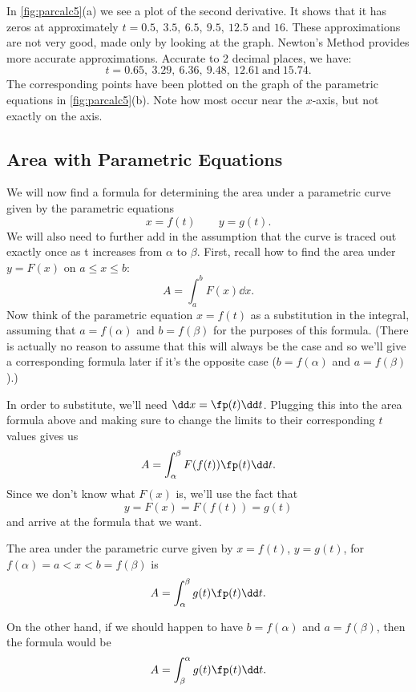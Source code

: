 \begin{example}
In \autoref{fig:parcalc5}(a) we see a plot of the second derivative. It shows that it has zeros at approximately $t=0.5,\ 3.5,\ 6.5,\ 9.5,\ 12.5$ and $16$. These approximations are not very good, made only by looking at the graph. Newton's Method provides more accurate approximations. Accurate to 2 decimal places, we have:
\[t=0.65,\ 3.29,\ 6.36,\ 9.48,\ 12.61\ \text{and}\ 15.74.\]
The corresponding points have been plotted on the graph of the parametric equations in \autoref{fig:parcalc5}(b). Note how most occur near the $x$-axis, but not exactly on the axis.
\end{example}


\subsection{Area with Parametric Equations}

We will now find a formula for determining the area under a parametric curve given by the parametric equations
\[x=f(t)\qquad y=g(t).\]
We will also need to further add in the assumption that the curve is traced out exactly once as t increases from $\alpha$ to $\beta$.
%
First, recall how to find the area under $y=F(x)$ on $a\le x\le b$:
\[A=\int_a^b F(x)\dd x.\]
Now think of the parametric equation $x=f(t)$ as a substitution in the integral, assuming that $a=f(\alpha)$ and $b=f(\beta)$ for the purposes of this formula.  (There is actually no reason to assume that this will always be the case and so we'll give a corresponding formula later if it's the opposite case ($b=f(\alpha)$ and $a=f(\beta)$).)

In order to substitute, we'll need $\dd x=\fp(t)\dd t$. Plugging this into the area formula above and making sure to change the limits to their corresponding $t$ values gives us
\[A=\int_\alpha^\beta F(f(t))\fp(t)\dd t.\]
Since we don't know what $F(x)$ is, we'll use the fact that
\[y=F(x)=F(f(t))=g(t)\]
and arrive at the formula that we want.

\begin{keyidea}\label{ki_param_area}%
The area under the parametric curve given by $x=f(t)$, $y=g(t)$, for $f(\alpha)=a<x<b=f(\beta)$ is
\[A=\int_\alpha^\beta g(t)\fp(t)\dd t.\]
\end{keyidea}

On the other hand, if we should happen to have $b=f(\alpha)$ and $a=f(\beta)$, then the formula would be
\[A=\int_\beta^\alpha g(t)\fp(t)\dd t.\]

